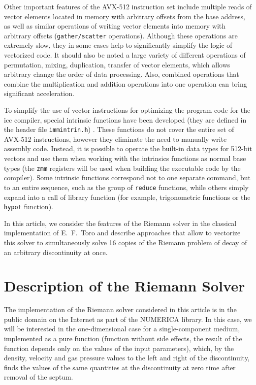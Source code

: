 \documentclass[utf8,english]{psta}%
\begin{document}
Other important features of the AVX-512 instruction set include multiple reads of vector elements located in memory with arbitrary offsets from the base address, as well as similar operations of writing vector elements into memory with arbitrary offsets (\texttt{gather/scatter} operations).
Although these operations are extremely slow, they in some cases help to significantly simplify the logic of vectorized code.
It should also be noted a large variety of different operations of permutation, mixing, duplication, transfer of vector elements, which allows arbitrary change the order of data processing.
Also, combined operations that combine the multiplication and addition operations into one operation can bring significant acceleration.

To simplify the use of vector instructions for optimizing the program code for the icc compiler, special intrinsic functions have been developed (they are defined in the header file \texttt{immintrin.h}) \cite{IntelIntrGuide}.
These functions do not cover the entire set of AVX-512 instructions, however they eliminate the need to manually write assembly code.
Instead, it is possible to operate the built-in data types for 512-bit vectors and use them when working with the intrinsics functions as normal base types (the \texttt{zmm} registers will be used when building the executable code by the compiler).
Some intrinsic functions correspond not to one separate command, but to an entire sequence, such as the group of \texttt{reduce} functions, while others simply expand into a call of library function (for example, trigonometric functions or the \texttt{hypot} function).

In this article, we consider the features of the Riemann solver in the classical implementation of E.~F.~Toro \cite{TorRiemann} and describe approaches that allow to vectorize this solver to simultaneously solve 16 copies of the Riemann problem of decay of an arbitrary discontinuity at once.

\section{Description of the Riemann Solver}

The implementation of the Riemann solver considered in this article is in the public domain on the Internet as part of the NUMERICA \cite{Numerica} library.
In this case, we will be interested in the one-dimensional case for a single-component medium, implemented as a pure function (function without side effects, the result of the function depends only on the values of the input parameters), which, by the density, velocity and gas pressure values to the left and right of the discontinuity, finds the values of the same quantities at the discontinuity at zero time after removal of the septum.
\end{document}
